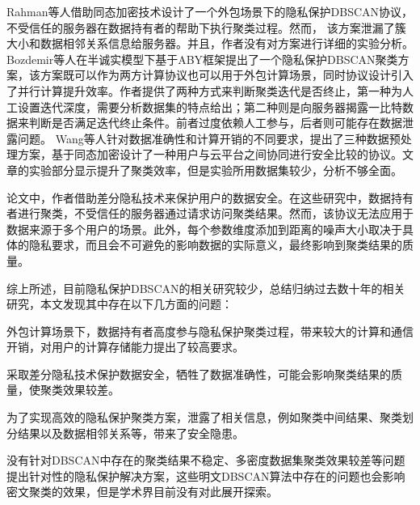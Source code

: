 Rahman等人\cite{rahman2017towards}借助同态加密技术设计了一个外包场景下的隐私保护DBSCAN协议，不受信任的服务器在数据持有者的帮助下执行聚类过程。然而， 该方案泄漏了簇大小和数据相邻关系信息给服务器。并且，作者没有对方案进行详细的实验分析。
Bozdemir等人\cite{2021Privacy}在半诚实模型下基于ABY框架\cite{2015ABY}提出了一个隐私保护DBSCAN聚类方案，该方案既可以作为两方计算协议也可以用于外包计算场景，同时协议设计引入了并行计算提升效率。作者提供了两种方式来判断聚类迭代是否终止，第一种为人工设置迭代深度，需要分析数据集的特点给出；第二种则是向服务器揭露一比特数据来判断是否满足迭代终止条件。前者过度依赖人工参与，后者则可能存在数据泄露问题。
Wang等人\cite{wang2022homomorphic}针对数据准确性和计算开销的不同要求，提出了三种数据预处理方案，基于同态加密设计了一种用户与云平台之间协同进行安全比较的协议。文章的实验部分显示提升了聚类效率，但是实验所用数据集较少，分析不够全面。

论文\cite{2018DP,2015A}中，作者借助差分隐私技术来保护用户的数据安全。在这些研究中，数据持有者进行聚类，不受信任的服务器通过请求访问聚类结果。然而，该协议无法应用于数据来源于多个用户的场景。此外，每个参数维度添加到距离的噪声大小取决于具体的隐私要求，而且会不可避免的影响数据的实际意义，最终影响到聚类结果的质量。


综上所述，目前隐私保护DBSCAN的相关研究较少，总结归纳过去数十年的相关研究，本文发现其中存在以下几方面的问题：
\begin{compactitem}
	\item 外包计算场景下，数据持有者高度参与隐私保护聚类过程，带来较大的计算和通信开销，对用户的计算存储能力提出了较高要求。
	\item 采取差分隐私技术保护数据安全，牺牲了数据准确性，可能会影响聚类结果的质量，使聚类效果较差。
	\item 为了实现高效的隐私保护聚类方案，泄露了相关信息，例如聚类中间结果、聚类划分结果以及数据相邻关系等，带来了安全隐患。
	\item 没有针对DBSCAN中存在的聚类结果不稳定、多密度数据集聚类效果较差等问题提出针对性的隐私保护解决方案，这些明文DBSCAN算法中存在的问题也会影响密文聚类的效果，但是学术界目前没有对此展开探索。
\end{compactitem}

